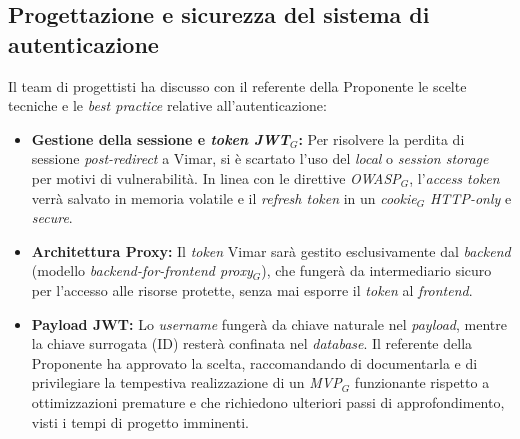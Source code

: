 \documentclass[10pt, letterpaper]{article}
\begin{document}
\subsection{Progettazione e sicurezza del sistema di autenticazione}
Il team di progettisti ha discusso con il referente della Proponente le scelte tecniche e le \textit{best practice} relative all'autenticazione:
\begin{itemize}
  \item \textbf{Gestione della sessione e \textit{token JWT$_G$}:} Per risolvere la perdita di sessione \textit{post-redirect} a Vimar, si è scartato l'uso
        del \textit{local} o \textit{session storage} per motivi di vulnerabilità. In linea con le direttive \textit{OWASP$_G$}, l'\textit{access token} verrà salvato in memoria volatile e il \textit{refresh token} in un \textit{cookie$_G$} \textit{HTTP-only} e \textit{secure}.
  \item \textbf{Architettura Proxy:} Il \textit{token} Vimar sarà gestito esclusivamente dal \textit{backend}
        (modello \textit{backend-for-frontend proxy$_G$}), che fungerà da intermediario sicuro per l'accesso alle risorse protette, senza mai esporre il \textit{token} al \textit{frontend}.
  \item \textbf{Payload JWT:} Lo \textit{username} fungerà da chiave naturale nel \textit{payload}, mentre la chiave surrogata (ID) resterà confinata nel \textit{database}.
        Il referente della Proponente ha approvato la scelta, raccomandando di documentarla e di privilegiare la tempestiva realizzazione di un \textit{MVP$_G$} funzionante rispetto a ottimizzazioni premature e che richiedono ulteriori passi di approfondimento, visti i tempi di progetto imminenti.
\end{itemize}




\makeDecisionTable


\makeTodoTable
\end{document}
